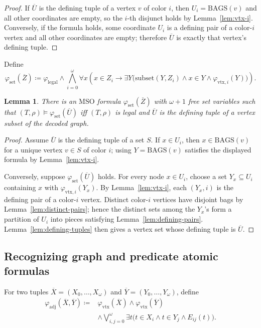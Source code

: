 \documentclass[11pt]{article}
\newtheorem{lemma}[theorem]{Lemma}
\theoremstyle{definition}
\newcommand{\MSO}{\ensuremath{\mathrm{MSO}}}
\newcommand{\defeq}{\coloneqq}
\newcommand{\Bags}{\mathrm{BAGS}}
\newcommand{\legal}{\mathrm{legal}}
\newcommand{\vtx}{\mathrm{vtx}}
\newcommand{\set}{\mathrm{set}}
\newcommand{\adj}{\mathrm{adj}}
\newcommand{\subsetf}{\mathrm{subset}}
\newcommand{\tuple}[1]{\overline{#1}}
\begin{document}
\begin{proof}
If \(\tuple U\) is the defining tuple of a vertex \(v\) of color \(i\), then
\(U_i=\Bags(v)\) and all other coordinates are empty, so the \(i\)-th disjunct
holds by Lemma~\ref{lem:vtx-i}.  Conversely, if the formula holds, some coordinate \(U_i\) is
a defining pair of a color-\(i\) vertex and all other coordinates are empty;
therefore \(\tuple U\) is exactly that vertex's defining tuple.
\end{proof}

Define
\[
  \varphi_{\set}(\tuple Z)
  \defeq
  \varphi_{\legal}\wedge
  \bigwedge_{i=0}^{\omega}
  \forall x\left(
    x\in Z_i\to
    \exists Y\bigl(\subsetf(Y,Z_i)\wedge x\in Y\wedge\varphi_{\vtx,i}(Y)\bigr)
  \right).
\]

\begin{lemma}\label{lem:set}
There is an \MSO{} formula \(\varphi_{\set}(\tuple Z)\) with \(\omega+1\) free set
variables such that \((T,\rho)\models\varphi_{\set}(\tuple U)\) iff \((T,\rho)\) is
legal and \(\tuple U\) is the defining tuple of a vertex subset of the decoded
graph.
\end{lemma}

\begin{proof}
Assume \(\tuple U\) is the defining tuple of a set \(S\).  If
\(x\in U_i\), then \(x\in\Bags(v)\) for a unique vertex \(v\in S\) of color \(i\);
using \(Y=\Bags(v)\) satisfies the displayed formula by Lemma~\ref{lem:vtx-i}.

Conversely, suppose \(\varphi_{\set}(\tuple U)\) holds.  For every node
\(x\in U_i\), choose a set \(Y_x\subseteq U_i\) containing \(x\) with
\(\varphi_{\vtx,i}(Y_x)\).  By Lemma~\ref{lem:vtx-i}, each \((Y_x,i)\) is the defining pair of
a color-\(i\) vertex.  Distinct color-\(i\) vertices have disjoint bags by
Lemma~\ref{lem:distinct-pairs}; hence the distinct sets among the \(Y_x\)'s form a partition of
\(U_i\) into pieces satisfying Lemma~\ref{lem:defining-pairs}.  Lemma~\ref{lem:defining-tuples} then gives a vertex set whose
defining tuple is \(\tuple U\).
\end{proof}

\subsection{Recognizing graph and predicate atomic formulas}

For two tuples \(\tuple X=(X_0,\ldots,X_\omega)\) and \(\tuple Y=(Y_0,\ldots,Y_\omega)\), define
\[
\begin{aligned}
  \varphi_{\adj}(\tuple X,\tuple Y)\defeq{}&
  \varphi_{\vtx}(\tuple X)\wedge\varphi_{\vtx}(\tuple Y)\\
  &\wedge\bigvee_{i,j=0}^{\omega}
  \exists t\bigl(t\in X_i\wedge t\in Y_j\wedge E_{ij}(t)\bigr).
\end{aligned}
\]
\end{document}
